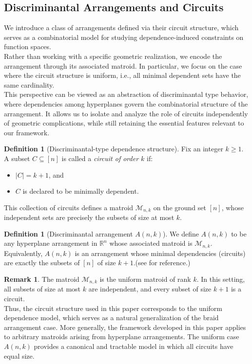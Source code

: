 \documentclass{amsart}
\theoremstyle{definition}
\newtheorem{definition}[theorem]{Definition}
\newtheorem{remark}[theorem]{Remark}
\begin{document}
\subsection{Discriminantal Arrangements and Circuits}
We introduce a class of arrangements defined via their circuit structure, which serves as a combinatorial model for studying dependence-induced constraints on function spaces.\\
\noindent
Rather than working with a specific geometric realization, we encode the arrangement through its associated matroid. In particular, we focus on the case where the circuit structure is uniform, i.e., all minimal dependent sets have the same cardinality.\\
\noindent
This perspective can be viewed as an abstraction of discriminantal type behavior, where dependencies among hyperplanes govern the combinatorial structure of the arrangement. It allows us to isolate and analyze the role of circuits independently of geometric complications, while still retaining the essential features relevant to our framework.
\noindent
\begin{definition}[Discriminantal-type dependence structure]
Fix an integer $k \geq 1$. A subset $C \subseteq [n]$ is called a \emph{circuit of order $k$} if:
\begin{itemize}
\item $|C| = k+1$, and
\item $C$ is declared to be minimally dependent.
\end{itemize}
\end{definition}
\noindent
This collection of circuits defines a matroid $\mathcal{M}_{n,k}$ on the ground set $[n]$, whose independent sets are precisely the subsets of size at most $k$.
\noindent
\begin{definition}[Discriminantal arrangement $A(n,k)$]
We define $A(n,k)$ to be any hyperplane arrangement in $\mathbb{R}^n$ whose associated matroid is $\mathcal{M}_{n,k}$.\\
\noindent
Equivalently, $A(n,k)$ is an arrangement whose minimal dependencies (circuits) are exactly the subsets of $[n]$ of size $k+1$.(see \cite{Pragnya2026} for reference.)
\end{definition}

\begin{remark}
The matroid $\mathcal{M}_{n,k}$ is the uniform matroid of rank $k$. In this setting, all subsets of size at most $k$ are independent, and every subset of size $k+1$ is a circuit.\\
\noindent
Thus, the circuit structure used in this paper corresponds to the uniform dependence model, which serves as a natural generalization of the braid arrangement case. More generally, the framework developed in this paper applies to arbitrary matroids arising from hyperplane arrangements. The uniform case $A(n,k)$ provides a canonical and tractable model in which all circuits have equal size.
\end{remark}
\end{document}
